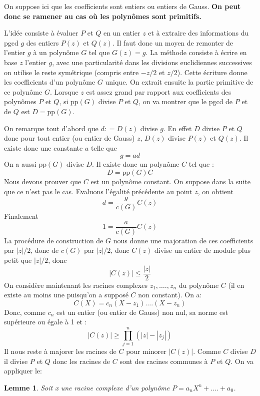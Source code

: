 \documentclass[a4paper,11pt]{article}
\newtheorem{lemma}[thm]{Lemme}
\begin{document}
\begin{giacjshere}
On suppose ici que les coefficients sont entiers ou entiers de Gauss.
{\bf{On peut donc se ramener au cas où les polynômes sont primitifs.}}

L'idée consiste à évaluer $P$ et $Q$ en un entier $z$ et à extraire des
informations du pgcd $g$ des entiers $P ( z )$ et $Q ( z )$. Il faut donc un
moyen de remonter de l'entier $g$ à un polynôme $G$ tel que $G ( z ) = g$. La
méthode consiste à écrire en base $z$ l'entier $g$, avec une particularité
dans les divisions euclidiennes successives on utilise le reste symétrique
(compris entre $- z / 2$ et $z / 2$). Cette écriture donne les coefficients
d'un polynôme $G$ unique. On extrait ensuite la partie primitive de ce
polynôme $G$. Lorsque $z$ est assez grand par rapport aux coefficients des
polynômes $P$ et $Q$, si $\mbox{pp} ( G )$ divise $P$ et $Q$, on va montrer
que le pgcd de $P$ et de $Q$ est $D = \mbox{pp} ( G )$.

On remarque tout d'abord que $d : = D ( z )$ divise $g$. En effet $D$ divise
$P$ et $Q$ donc pour tout entier (ou entier de Gauss) $z$, $D ( z )$ divise $P
( z )$ et $Q ( z )$. Il existe donc une constante $a$ telle que
\[ g = a d \]
On a aussi $\mbox{pp} ( G )$ divise $D$. Il existe donc un polynôme $C$ tel
que :
\[ D = \mbox{pp} ( G ) C \]
Nous devons prouver que $C$ est un polynôme constant. On suppose dans la suite
que ce n'est pas le cas. Evaluons l'égalité précédente au point $z$, on
obtient
\[ d = \frac{g}{c ( G )} C ( z ) \]
Finalement
\[ 1 = \frac{a}{c ( G )} C ( z ) \]
La procédure de construction de $G$ nous donne une majoration de ces
coefficients par $| z | / 2$, donc de $c ( G )$ par $| z | / 2$, donc $C ( z
)$ divise un entier de module plus petit que $| z | / 2$, donc
\[ | C ( z ) | \leqslant \frac{| z |}{2} \]
On considère maintenant les racines complexes $z_1, \ldots ., z_n$ du polynôme
$C$ (il en existe au moins une puisqu'on a supposé $C$ non constant). On a:
\[ C ( X ) = c_n ( X - z_1 ) \ldots . ( X - z_n ) \]
Donc, comme $c_n$ est un entier (ou entier de Gauss) non nul, sa norme est
supérieure ou égale à 1 et :
\[ | C ( z ) | \geqslant \prod^n_{j = 1} ( | z | - | z_j | ) \]
Il nous reste à majorer les racines de $C$ pour minorer $| C ( z ) |$. Comme
$C$ divise $D$ il divise $P$ et $Q$ donc les racines de $C$ sont des racines
communes à $P$ et $Q$. On va appliquer le:

\begin{lemma} \label{lemme:majoration}
  Soit x une racine complexe d'un polynôme $P = a_n X^n + \ldots . + a_0$.
  

\end{lemma}
\end{giacjshere}
\end{document}
